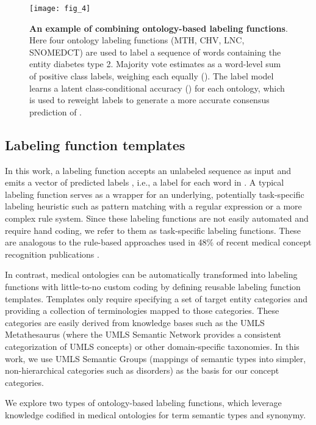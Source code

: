 \documentclass{article}
\begin{document}
\begin{figure}[ht]
\centering
\texttt{[image: fig\_4]}
\caption{\label{fig:words}\textbf{An example of combining ontology-based labeling functions}. Here four ontology labeling functions {(MTH, CHV, LNC, SNOMEDCT)} are used to label a sequence of words  containing the entity {diabetes type 2}. Majority vote estimates  as a word-level sum of positive class labels, weighing each equally (). The label model learns a latent class-conditional accuracy () for each ontology, which is used to reweight labels to generate a more accurate consensus prediction of . }
\end{figure}



\subsection*{Labeling function templates}

In this work, a labeling function  accepts an unlabeled sequence  as input and emits a vector of predicted labels , i.e., a label  for each word in . 
A typical labeling function serves as a wrapper for an underlying, potentially task-specific labeling heuristic such as pattern matching with a regular expression or a more complex rule system. 
Since these labeling functions are not easily automated and require hand coding, we refer to them as task-specific labeling functions. 
These are analogous to the rule-based approaches used in 48\% of recent medical concept recognition publications \cite{Fu2020-hh}.

In contrast, medical ontologies can be automatically
transformed into labeling functions with little-to-no custom coding by defining reusable labeling function templates. 
Templates only require specifying a set of target entity categories
and providing a collection of terminologies mapped to those categories. 
These categories are easily derived from knowledge bases such as the UMLS Metathesaurus (where the UMLS Semantic Network \cite{mccray2003upper} provides a consistent categorization of UMLS concepts) or other domain-specific taxonomies.
In this work, we use UMLS Semantic Groups \cite{mccray2001aggregating} (mappings of semantic types into simpler, non-hierarchical categories such as disorders) as the basis for our concept categories.

We explore two types of ontology-based labeling functions, which leverage knowledge codified in medical ontologies for term semantic types and synonymy.
\end{document}
